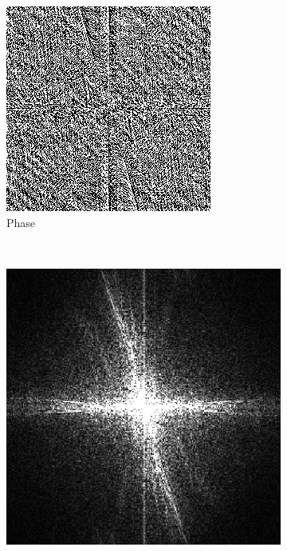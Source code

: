 \documentclass{report}
\begin{document}
\begin{figure}[H]
\begin{subfigure}[b]{0.2\textwidth}
                \includegraphics[width=\textwidth]{graphics/phase.png}
                \caption{Phase}
                \label{fig:mouse}
        \end{subfigure}
        ~
        \begin{subfigure}[b]{0.2\textwidth}
                \includegraphics[width=\textwidth]{graphics/ampl.png}

\end{subfigure}
\end{figure}
\end{document}
